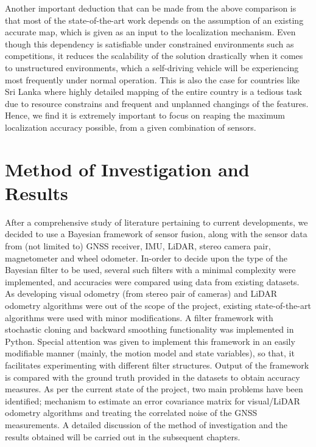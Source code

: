 Another important deduction that can be made from the above comparison is that most of the state-of-the-art work depends on the assumption of an existing accurate map, which is given as an input to the localization mechanism. Even though this dependency is satisfiable under constrained environments such as competitions, it reduces the scalability of the solution drastically when it comes to unstructured environments, which a self-driving vehicle will be experiencing most frequently under normal operation. This is also the case for countries like Sri Lanka where highly detailed mapping of the entire country is a tedious task due to resource constrains and frequent and unplanned changings of the features. Hence, we find it is extremely important to focus on reaping the maximum localization accuracy possible, from a given combination of sensors.





\section{Method of Investigation and Results}
After a comprehensive study of literature pertaining to current developments, we decided to use a Bayesian framework of sensor fusion, along with the sensor data from (not limited to) \gls{GNSS} receiver, \gls{IMU}, \gls{LiDAR}, stereo camera pair, magnetometer and wheel odometer. In-order to decide upon the type of the Bayesian filter to be used, several such filters with a minimal complexity were implemented, and accuracies were compared using data from existing datasets. As developing visual odometry (from stereo pair of cameras) and \gls{LiDAR} odometry algorithms were out of the scope of the project, existing state-of-the-art algorithms were used with minor modifications. A filter framework with stochastic cloning and backward smoothing functionality was implemented in Python. Special attention was given to implement this framework in an easily modifiable manner (mainly, the motion model and state variables), so that, it facilitates experimenting with different filter structures. Output of the framework is compared with the ground truth provided in the datasets to obtain accuracy measures. As per the current state of the project, two main problems have been identified; mechanism to estimate an error covariance matrix for visual/\gls{LiDAR} odometry algorithms and treating the correlated noise of the \gls{GNSS} measurements. A detailed discussion of the method of investigation and the results obtained will be carried out in the subsequent chapters.